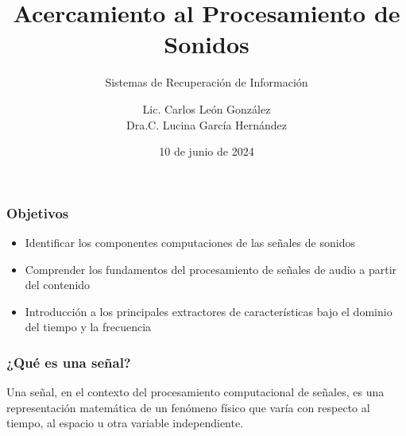 \documentclass[
10pt, %
aspectratio=169, %
]{beamer}
\title[Short Title]{Acercamiento al Procesamiento de Sonidos}
\subtitle{Sistemas de Recuperación de Información}
\author{Lic. Carlos León González \\ Dra.C. Lucina García Hernández}
\institute[UC]{Facultad de Matem\'atica y Computaci\'on \\ Universidad de La Habana \\ \smallskip }
\date{10 de junio de  2024} %
\begin{document}
	
	
	
	\begin{frame}
		\titlepage
	\end{frame}
	
	\begin{frame}
		
		\frametitle{Objetivos}
		
		\begin{itemize}
			\item Identificar los componentes computaciones de las señales de sonidos
			
			\item Comprender los fundamentos del procesamiento de señales de audio a partir del contenido
			
			\item Introducción a los principales extractores de características bajo el dominio del tiempo y la frecuencia
			
		\end{itemize}
		
	\end{frame}
	
	\begin{frame}
		
		\frametitle{¿Qué es una señal?}
		
		\begin{alertblock}{}
			Una señal, en el contexto del procesamiento computacional de señales, es una representación matemática de un fenómeno físico que varía con respecto al tiempo, al espacio u otra variable independiente. 
		\end{alertblock}
		
	\end{frame}
	
\end{document}
